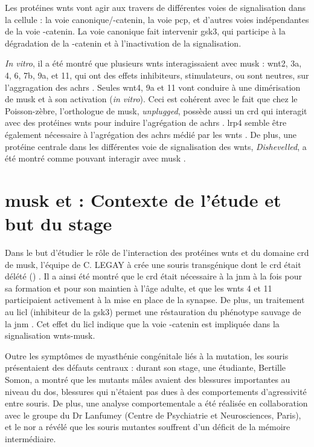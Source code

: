 	Les protéines \glspl{wnt} vont agir aux travers de différentes voies de signalisation dans la cellule : la voie canonique/\textbeta{}-catenin, la voie \gls{pcp}, et d'autres voies indépendantes de la voie \textbeta{}-catenin. La voie canonique fait intervenir \gls{gsk3}, qui participe à la dégradation de la \textBeta{}-catenin et à l'inactivation de la signalisation. 
	
	\emph{In vitro}, il a été montré que plusieurs \Glspl{wnt} interagissaient avec \gls{musk} : \Gls{wnt}2, 3a, 4, 6, 7b, 9a, et 11, qui ont des effets inhibiteurs, stimulateurs, ou sont neutres, sur l'aggragation des \glspl{achr} \cite{Strochlic2012, Zhang2012, Barik2014}. Seules \gls{wnt}4, 9a et 11 vont conduire à une dimérisation de \gls{musk} et à son activation (\emph{in vitro}). Ceci est cohérent avec le fait que chez le Poisson-zèbre, l'orthologue de \gls{musk}, \emph{unplugged}, possède aussi un \gls{crd} qui interagit avec des protéines \Glspl{wnt} pour induire l'agrégation de \glspl{achr} \cite{Jing2009, Gordon2012}. \Gls{lrp}4 semble être également nécessaire à l'agrégation des \glspl{achr} médié par les \gls{wnt}s \cite{Zhang2012}. De plus, une protéine centrale dans les différentes voie de signalisation des \Glspl{wnt}, \emph{Dishevelled}, a été montré comme pouvant interagir avec \gls{musk} \cite{Luo2002a}.

\section{\acrshort{musk} et  : Contexte de l'étude et but du stage}
\label{sec:Contexte}	
	Dans le but d'étudier le rôle de l'interaction des protéines \Glspl{wnt} et du domaine \gls{crd} de \gls{musk}, l'équipe de C. LEGAY à crée une souris transgénique dont le \gls{crd} était délété (\mcrd) \cite{Messeant2015, Messeant2017}. Il a ainsi été montré que le \gls{crd} était nécessaire à la \gls{jnm} à la fois pour sa formation et pour son maintien à l'âge adulte, et que les \Glspl{wnt} 4 et 11 participaient activement à la mise en place de la synapse. De plus, un traitement au \gls{licl} (inhibiteur de la \gls{gsk3}) permet une réstauration du phénotype sauvage de la \gls{jnm} \cite{Messeant2015}. Cet effet du \gls{licl} indique que la voie \textbeta{}-catenin est impliquée dans la signalisation \Glspl{wnt}-\gls{musk}. 
	
	Outre les symptômes de myasthénie congénitale liés à la mutation, les souris \mcrd présentaient des défauts centraux : durant son stage, une étudiante, Bertille Somon, a montré que les mutants mâles avaient des blessures importantes au niveau du dos, blessures qui n'étaient pas dues à des comportements d'agressivité entre souris. De plus, une analyse comportementale a été réalisée en collaboration avec le groupe du Dr Lanfumey (Centre de Psychiatrie et Neurosciences, Paris), et le \gls{nor} a révélé que les souris mutantes souffrent d'un déficit de la mémoire intermédiaire.
	
